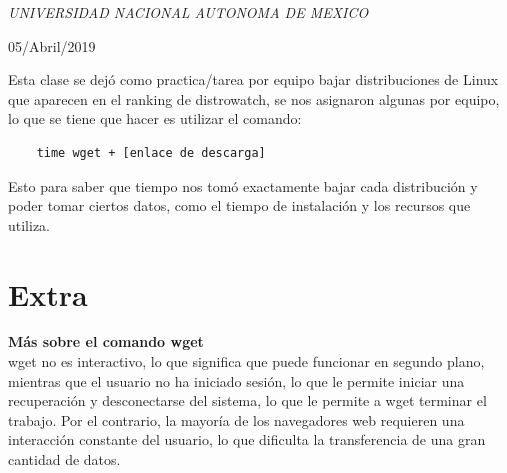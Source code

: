 \documentclass[a4paper, 11pt, oneside]{article}
\begin{document}
\begin{titlepage}
	\textit{UNIVERSIDAD NACIONAL AUTONOMA DE MEXICO} 
	
	\vfill
	
	
	
	
	\vspace{0.3\baselineskip} 
	
	05/Abril/2019 
	
	

\end{titlepage}
Esta clase se dejó como practica/tarea por equipo bajar distribuciones de Linux que aparecen en el ranking de distrowatch, se nos asignaron algunas por equipo, lo que se tiene que hacer es utilizar el comando:
\begin{verbatim}
    time wget + [enlace de descarga]
\end{verbatim}
Esto para saber que tiempo nos tomó exactamente bajar cada distribución y poder tomar ciertos datos, como el tiempo de instalación y los recursos que utiliza.

\section*{Extra}
\textbf{Más sobre el comando wget}\\
wget no es interactivo, lo que significa que puede funcionar en segundo plano, mientras que el usuario no ha iniciado sesión, lo que le permite iniciar una recuperación y desconectarse del sistema, lo que le permite a wget terminar el trabajo. Por el contrario, la mayoría de los navegadores web requieren una interacción constante del usuario, lo que dificulta la transferencia de una gran cantidad de datos.
\end{document}
